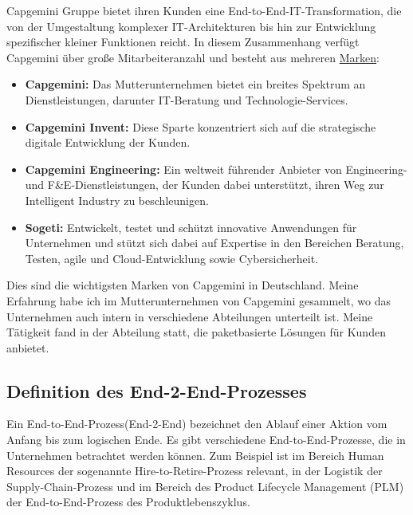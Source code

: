 \documentclass[a4paper, 12pt]{scrartcl}
\begin{document}
Capgemini Gruppe bietet ihren Kunden eine End-to-End-IT-Transformation, die von der Umgestaltung komplexer IT-Architekturen bis hin zur Entwicklung spezifischer kleiner Funktionen reicht. In diesem Zusammenhang verfügt Capgemini über große Mitarbeiteranzahl und besteht aus mehreren \href{https://www.capgemini.com/de-de/unternehmen/wer-wir-sind/unsere-marken/}{ Marken}:
	\begin{itemize}
		\item \textbf{Capgemini:} Das Mutterunternehmen bietet ein breites Spektrum an Dienstleistungen, darunter IT-Beratung und Technologie-Services.
		
		\item \textbf{Capgemini Invent:} Diese Sparte konzentriert sich auf die strategische digitale Entwicklung der Kunden.
		\item \textbf{Capgemini Engineering:} Ein weltweit führender Anbieter von Engineering- und F\&E-Dienstleistungen, der Kunden dabei unterstützt, ihren Weg zur Intelligent Industry zu beschleunigen.
		\item \textbf{Sogeti:} Entwickelt, testet und schützt innovative Anwendungen für Unternehmen und stützt sich dabei auf Expertise in den Bereichen Beratung, Testen, agile und Cloud-Entwicklung sowie Cybersicherheit.
	\end{itemize}
Dies sind die wichtigsten Marken von Capgemini in Deutschland. Meine Erfahrung habe ich im Mutterunternehmen von Capgemini gesammelt, wo das Unternehmen auch intern in verschiedene Abteilungen unterteilt ist. Meine Tätigkeit fand in der Abteilung statt, die paketbasierte Lösungen %
  für Kunden anbietet.


	\newpage
	\subsection{Definition des End-2-End-Prozesses}
Ein End-to-End-Prozess(End-2-End) bezeichnet den Ablauf einer Aktion vom Anfang bis zum logischen Ende. Es gibt verschiedene End-to-End-Prozesse, die in Unternehmen betrachtet werden können. Zum Beispiel ist im Bereich Human Resources der sogenannte Hire-to-Retire-Prozess relevant, in der Logistik der Supply-Chain-Prozess und im Bereich des Product Lifecycle Management (PLM) der End-to-End-Prozess des Produktlebenszyklus.
\end{document}
